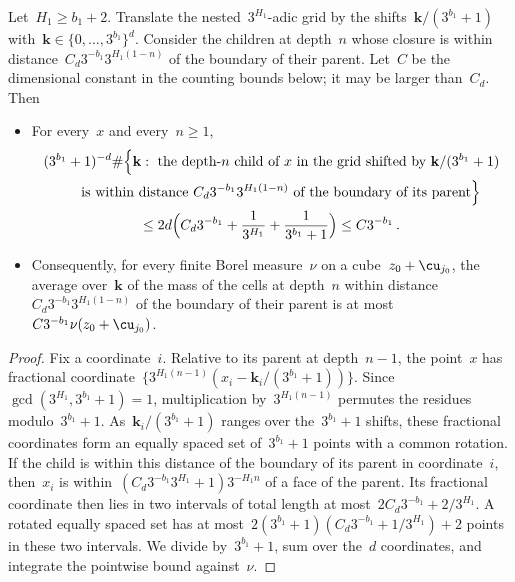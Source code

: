 \documentclass[11pt]{amsart}
\begin{document}
\begin{lemma}
\label{mfd:lem-shifts}
Let~$H_1\geq b_1+2$. Translate the nested~$3^{H_1}$-adic grid by the shifts~$\mathbf k/(3^{b_1}+1)$ with~$\mathbf k\in\{0,\ldots,3^{b_1}\}^d$. Consider the children at depth~$n$ whose closure is within distance~$C_d3^{-b_1}3^{H_1(1-n)}$ of the boundary of their parent. Let~$C$ be the dimensional constant in the counting bounds below; it may be larger than~$C_d$. Then
\begin{itemize}
\item For every~$x$ and every~$n\geq1$,
\begin{multline*}
	(3^{b_1}+1)^{-d}\# \Bigl\{\mathbf k:\ \text{the depth-$n$ child of }x\text{ in the grid shifted by }\mathbf k/(3^{b_1}+1)
	\\
	\text{ \quad is within distance }C_d3^{-b_1}3^{H_1(1-n)}\text{ of the boundary of its parent} \Bigr\}
	\\
	\leq2d\Bigl(C_d3^{-b_1}+\frac1{3^{H_1}}+\frac1{3^{b_1}+1}\Bigr)
	\leq C3^{-b_1}\,.
\end{multline*}
\item Consequently, for every finite Borel measure~$\nu$ on a cube~$z_0+\cu_{j_0}$, the average over~$\mathbf k$ of the mass of the cells at depth~$n$ within distance~$C_d3^{-b_1}3^{H_1(1-n)}$ of the boundary of their parent is at most~$C3^{-b_1}\nu(z_0+\cu_{j_0})$.
\end{itemize}
\end{lemma}

\begin{proof}
Fix a coordinate~$i$. Relative to its parent at depth~$n-1$, the point~$x$ has fractional coordinate~$\{3^{H_1(n-1)}(x_i-\mathbf k_i/(3^{b_1}+1))\}$. Since~$\gcd(3^{H_1},3^{b_1}+1)=1$, multiplication by~$3^{H_1(n-1)}$ permutes the residues modulo~$3^{b_1}+1$. As~$\mathbf k_i/(3^{b_1}+1)$ ranges over the~$3^{b_1}+1$ shifts, these fractional coordinates form an equally spaced set of~$3^{b_1}+1$ points with a common rotation. If the child is within this distance of the boundary of its parent in coordinate~$i$, then~$x_i$ is within~$(C_d3^{-b_1}3^{H_1}+1)3^{-H_1n}$ of a face of the parent. Its fractional coordinate then lies in two intervals of total length at most~$2C_d3^{-b_1}+2/3^{H_1}$. A rotated equally spaced set has at most~$2(3^{b_1}+1)(C_d3^{-b_1}+1/3^{H_1})+2$ points in these two intervals. We divide by~$3^{b_1}+1$, sum over the~$d$ coordinates, and integrate the pointwise bound against~$\nu$.
\end{proof}
\end{document}
